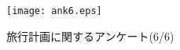 \documentclass{funthesis}
\begin{document}
\begin{figure}[htpb]
\begin{center}
\texttt{[image: ank6.eps]}
\caption{旅行計画に関するアンケート(6/6)}
\end{center}
\end{figure}



\listoffigures

\listoftables
\end{document}
